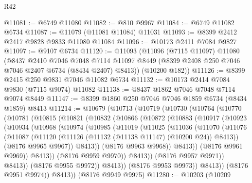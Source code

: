 \begin{lexlean}{R42}
\begin{coremodule}
{@11081 := @6749 @11080
@11082 := @810 @9967
@11084 := @6749 @11082 @6734
@11087 := @11079 (@11081 @11084) @11031
@11093 := @8399 @2412 @2417 @9828 @9833 @11080 @11084
@11096 := @10173 @2411 @7084 @9827
@11097 := @9107 @6734
@11120 := @11093
    (@11096
      (@7115 @11097)
      @11080
      (@8437
        @2410
        @7046
        @7048
        @7114
        @11097
        @8449
        (@8399 @2408 @250 @7046 @7046 @2407 @6734 (@8434 @2407) @8413))
      (@10200 @182))
@11126 := @8399 @2415 @250 @9831 @7046 @11082 @6734
@11132 := @10173 @2414 @7084 @9830 (@7115 @9074) @11082
@11138 := @8437 @1862 @7046 @7048 @7114 @9074 @8449
@11147 := @8399 @1860 @250 @7046 @7046 @1859 @6734 (@8434 @1859) @8413
@11214 := @10679
    (@10713
      (@10719
        (@10730
          (@10764
            (@10770
              (@10781
                (@10815
                  (@10821
                    (@10832
                      (@10866
                        (@10872
                          (@10883
                            (@10917
                              (@10923
                                (@10934
                                  (@10968
                                    (@10974
                                      (@10985
                                        (@11019
                                          (@11025
                                            (@11036
                                              (@11070
                                                (@11076
                                                  (@11087
                                                    (@11120
                                                      (@11126
                                                        (@11132 (@11138 @11147) (@10200 @24))
                                                        @8413))
                                                    (@8176 @9965 @9967))
                                                  @8413))
                                              (@8176 @9963 @9968))
                                            @8413))
                                        (@8176 @9961 @9969))
                                      @8413))
                                  (@8176 @9959 @9970))
                                @8413))
                            (@8176 @9957 @9971))
                          @8413))
                      (@8176 @9955 @9972))
                    @8413))
                (@8176 @9953 @9973))
              @8413))
          (@8176 @9951 @9974))
        @8413))
    (@8176 @9949 @9975)
@11280 := @10203
    (@10209
}
\end{coremodule}
\end{lexlean}
